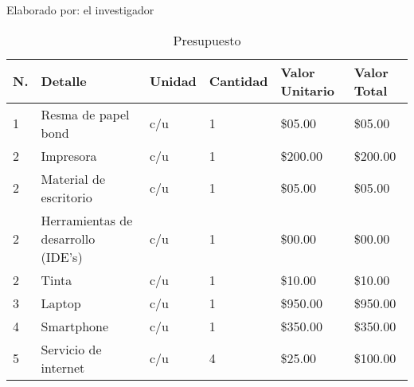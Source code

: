 \begin{ThreePartTable}
	\begin{TableNotes}[flushleft]
		\centering
		\item Elaborado por: el investigador
	\end{TableNotes}
	\begin{longtable}{|l |p{}| l| l| p{}| p{}|}
		\caption{Presupuesto}
		\label{table:presupuesto}                                                                                                                                                     \\
		\hline
		\textbf{N.}                                       & \textbf{Detalle}                   & \textbf{Unidad} & \textbf{Cantidad} & \textbf{Valor Unitario} & \textbf{Valor Total} \\
		\hline
		1                                                 & Resma de papel bond                & c/u             & 1                 & \$05.00                 & \$05.00              \\\hline
		2                                                 & Impresora                          & c/u             & 1                 & \$200.00                & \$200.00             \\\hline
		2                                                 & Material de escritorio             & c/u             & 1                 & \$05.00                 & \$05.00              \\\hline
		2                                                 & Herramientas de desarrollo (IDE's) & c/u             & 1                 & \$00.00                 & \$00.00              \\\hline
		2                                                 & Tinta                              & c/u             & 1                 & \$10.00                 & \$10.00              \\\hline
		3                                                 & Laptop                             & c/u             & 1                 & \$950.00                & \$950.00             \\\hline
		4                                                 & Smartphone                         & c/u             & 1                 & \$350.00                & \$350.00             \\\hline
		5                                                 & Servicio de internet               & c/u             & 4                 & \$25.00                 & \$100.00             \\\hline

\end{longtable}
\end{ThreePartTable}
